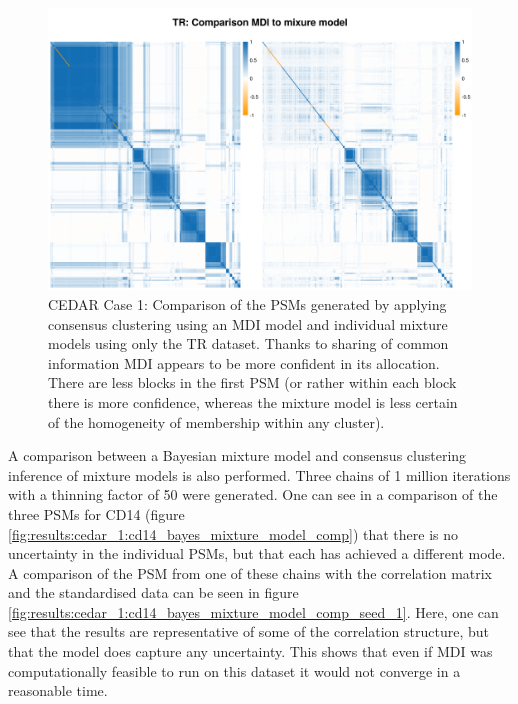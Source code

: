 \documentclass[12pt]{article} %
\begin{document}
	\begin{figure} %
		\centering
		\includegraphics[scale=0.75]{Images/Biology_data/Set_250/Comparison_mdi_mixture_model/TR_comparison_all_specific_sim.png}
		\caption{CEDAR Case 1: Comparison of the PSMs generated by applying consensus clustering using an MDI model and individual mixture models using only the TR dataset. Thanks to sharing of common information MDI appears to be more confident in its allocation. There are less blocks in the first PSM (or rather within each block there is more confidence, whereas the mixture model is less certain of the homogeneity of membership within any cluster).}
		\label{fig:results:cedar_1:mdi_mixture_model_comp_tr}
	\end{figure}
	
	A comparison between a Bayesian mixture model and consensus clustering inference of mixture models is also performed. Three chains of 1 million iterations with a thinning factor of 50 were generated. One can see in a comparison of the three PSMs for CD14 (figure \ref{fig:results:cedar_1:cd14_bayes_mixture_model_comp}) that there is no uncertainty in the individual PSMs, but that each has achieved a different mode. A comparison of the PSM from one of these chains with the correlation matrix and the standardised data can be seen in figure \ref{fig:results:cedar_1:cd14_bayes_mixture_model_comp_seed_1}. Here, one can see that the results are representative of some of the correlation structure, but that the model does capture any uncertainty. This shows that even if MDI was computationally feasible to run on this dataset it would not converge in a reasonable time.
	
\end{document}
